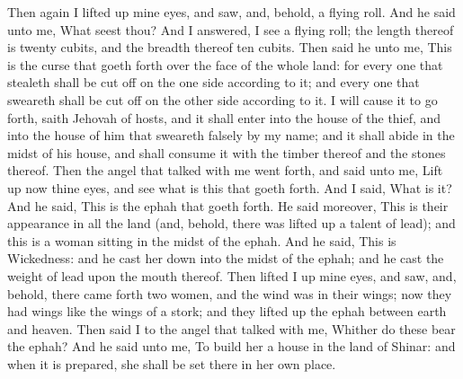Then again I lifted up mine eyes, and saw, and, behold, a flying roll. And he said unto me, What seest thou? And I answered, I see a flying roll; the length thereof is twenty cubits, and the breadth thereof ten cubits. Then said he unto me, This is the curse that goeth forth over the face of the whole land: for every one that stealeth shall be cut off on the one side according to it; and every one that sweareth shall be cut off on the other side according to it. I will cause it to go forth, saith Jehovah of hosts, and it shall enter into the house of the thief, and into the house of him that sweareth falsely by my name; and it shall abide in the midst of his house, and shall consume it with the timber thereof and the stones thereof.  Then the angel that talked with me went forth, and said unto me, Lift up now thine eyes, and see what is this that goeth forth. And I said, What is it? And he said, This is the ephah that goeth forth. He said moreover, This is their appearance in all the land (and, behold, there was lifted up a talent of lead); and this is a woman sitting in the midst of the ephah. And he said, This is Wickedness: and he cast her down into the midst of the ephah; and he cast the weight of lead upon the mouth thereof. Then lifted I up mine eyes, and saw, and, behold, there came forth two women, and the wind was in their wings; now they had wings like the wings of a stork; and they lifted up the ephah between earth and heaven. Then said I to the angel that talked with me, Whither do these bear the ephah? And he said unto me, To build her a house in the land of Shinar: and when it is prepared, she shall be set there in her own place. 

